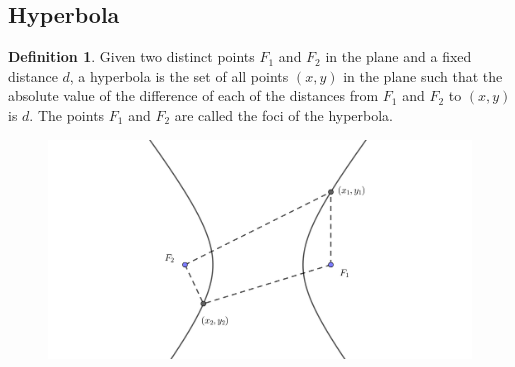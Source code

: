 \documentclass[a4paper]{article}
\theoremstyle{definition}
\newtheorem*{defi}{Definition}
\begin{document}
\subsection{Hyperbola}
\begin{defi}
    Given two distinct points $F_1$ and $F_2$ in the plane and a fixed distance
    $d$, a hyperbola is the set of all points $(x,y)$ in the plane such that the
    absolute value of the difference of each of the distances from $F_1$ and
    $F_2$ to $(x,y)$ is $d$. The points $F_1$ and $F_2$ are called the foci of
    the hyperbola.
\end{defi}

\begin{figure}[h]
      \centering
      \includegraphics[scale = 1.6]{hyperbola1.png}
\end{figure}
\end{document}
